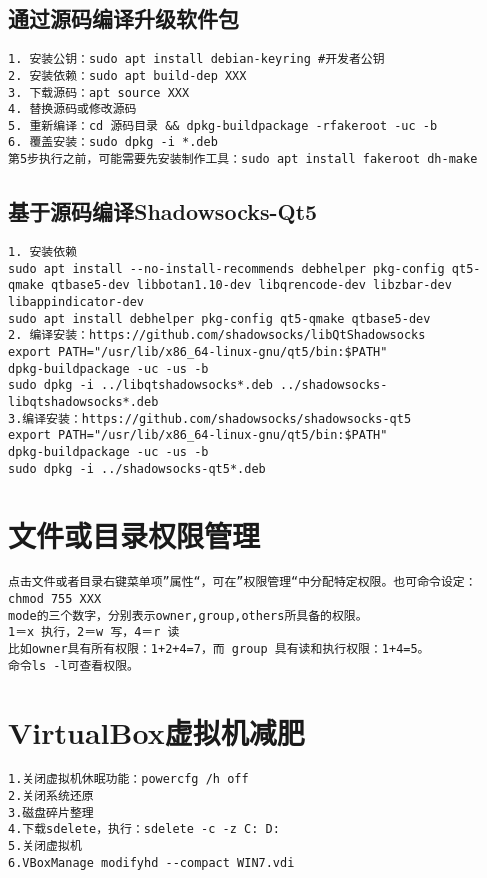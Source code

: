 \documentclass[a4paper,fontset=fandol,zihao=-4,linespread=1.2]{ctexbook}
\begin{document}
\subsection{通过源码编译升级软件包}
\begin{lstlisting}
1. 安装公钥：sudo apt install debian-keyring #开发者公钥
2. 安装依赖：sudo apt build-dep XXX
3. 下载源码：apt source XXX
4. 替换源码或修改源码
5. 重新编译：cd 源码目录 && dpkg-buildpackage -rfakeroot -uc -b
6. 覆盖安装：sudo dpkg -i *.deb
第5步执行之前，可能需要先安装制作工具：sudo apt install fakeroot dh-make
\end{lstlisting}

\subsection{基于源码编译Shadowsocks-Qt5}
\begin{lstlisting}
1. 安装依赖
sudo apt install --no-install-recommends debhelper pkg-config qt5-qmake qtbase5-dev libbotan1.10-dev libqrencode-dev libzbar-dev libappindicator-dev
sudo apt install debhelper pkg-config qt5-qmake qtbase5-dev
2. 编译安装：https://github.com/shadowsocks/libQtShadowsocks
export PATH="/usr/lib/x86_64-linux-gnu/qt5/bin:$PATH"
dpkg-buildpackage -uc -us -b
sudo dpkg -i ../libqtshadowsocks*.deb ../shadowsocks-libqtshadowsocks*.deb
3.编译安装：https://github.com/shadowsocks/shadowsocks-qt5
export PATH="/usr/lib/x86_64-linux-gnu/qt5/bin:$PATH"
dpkg-buildpackage -uc -us -b
sudo dpkg -i ../shadowsocks-qt5*.deb
\end{lstlisting}

\section{文件或目录权限管理}
\begin{lstlisting}
点击文件或者目录右键菜单项”属性“，可在”权限管理“中分配特定权限。也可命令设定：
chmod 755 XXX
mode的三个数字，分别表示owner,group,others所具备的权限。
1＝x 执行，2＝w 写，4＝r 读
比如owner具有所有权限：1+2+4=7，而 group 具有读和执行权限：1+4=5。
命令ls -l可查看权限。
\end{lstlisting}

\section{VirtualBox虚拟机减肥}
\begin{lstlisting}
1.关闭虚拟机休眠功能：powercfg /h off
2.关闭系统还原
3.磁盘碎片整理
4.下载sdelete，执行：sdelete -c -z C: D:
5.关闭虚拟机
6.VBoxManage modifyhd --compact WIN7.vdi
\end{lstlisting}
\end{document}
